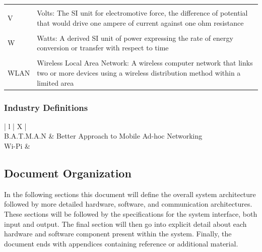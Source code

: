 \documentclass[11pt,a4paper]{article}
\begin{document}
\begin{center}
\begin{tabularx}{\textwidth}{ | l | X | }
		& \\
	V				& Volts: The SI unit for electromotive force, the difference of potential that would drive one ampere of current against one ohm resistance \\
		& \\
	W				& Watts: A derived SI unit of power expressing the rate of energy conversion or transfer with respect to time \\
		& \\
	WLAN			& Wireless Local Area Network: A wireless computer network that links two or more devices using a wireless distribution method within a limited area \\
	\hline
\end{tabularx}
\end{center}

\subsubsection{Industry Definitions}
\begin{center}
\begin{tabularx}{\textwidth}{ | l | X | }
	\hline
	 \\
	\hline
	B.A.T.M.A.N		& Better Approach to Mobile Ad-hoc Networking \\
	Wi-Pi 			&  \\
	\hline
\end{tabularx}
\end{center}

\subsection{Document Organization}
In the following sections this document will define the overall system architecture followed by more detailed hardware, software, and communication architectures. These sections will be followed by the specifications for the system interface, both input and output. The final section will then go into explicit detail about each hardware and software component present within the system. Finally, the document ends with appendices containing reference or additional material. 
\end{document}
